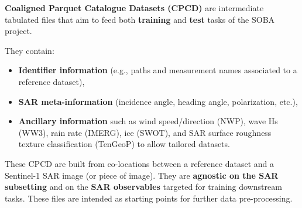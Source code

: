 
\begin{tcolorbox}[colback=lightgray, colframe=esa_teal, title=\textbf{Definition: Coaligned Parquet Catalogue Datasets (CPCD)}]
\textbf{Coaligned Parquet Catalogue Datasets (CPCD)} are intermediate tabulated files that aim to feed both \textbf{training} and \textbf{test} tasks of the SOBA project. 

They contain:
\begin{itemize}
    \item \textbf{Identifier information} (e.g., paths and measurement names associated to a reference dataset),
    \item \textbf{SAR meta-information} (incidence angle, heading angle, polarization, etc.),
    \item \textbf{Ancillary information} such as wind speed/direction (NWP), wave Hs (WW3), rain rate (IMERG), ice (SWOT), and SAR surface roughness texture classification (TenGeoP) to allow tailored datasets.
\end{itemize}

These CPCD are built from co-locations between a reference dataset and a Sentinel-1 SAR image (or piece of image). They are \textbf{agnostic on the SAR subsetting} and on the \textbf{SAR observables} targeted for training downstream tasks. These files are intended as starting points for further data pre-processing.
\end{tcolorbox}